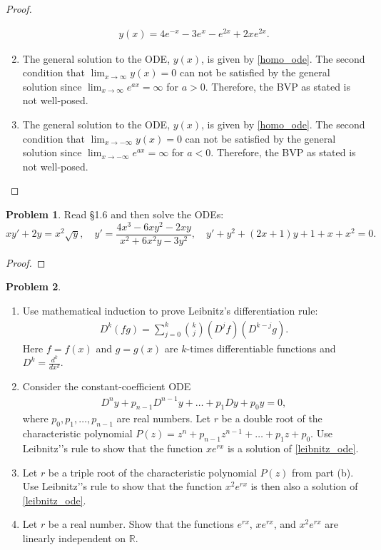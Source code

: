 \documentclass[12pt]{article}
\theoremstyle{definition}
\newtheorem{problem}{Problem}
\begin{document}
\begin{proof}
\begin{enumerate}
\begin{align*}
        y(x) = 4 e^{-x} -3e^{x} -e^{2x} +2xe^{2x}.
      \end{align*}
    \item The general solution to the ODE, $y(x)$, is given by \eqref{homo_ode}.
      The second condition that $\lim_{x\to\infty} y(x) = 0$ can not be satisfied
      by the general solution since $\lim_{x\to\infty} e^{ax} = \infty$ for $a>0$. Therefore,
      the BVP as stated is not well-posed.
    \item The general solution to the ODE, $y(x)$, is given by \eqref{homo_ode}.
      The second condition that $\lim_{x\to-\infty} y(x) = 0$ can not be satisfied
      by the general solution since $\lim_{x\to-\infty} e^{ax} = \infty$ for $a<0$. Therefore,
      the BVP as stated is not well-posed.
  \end{enumerate}
\end{proof}
\newpage


\begin{problem}
  Read \S1.6 and then solve the ODEs:
  $$xy' + 2y = x^2\sqrt{y}, \quad y' = \frac{4x^3-6xy^2-2xy}{x^2+6x^2y-3y^2}, \quad y' + y^2 +(2x+1)y + 1 + x + x^2 = 0.$$
\end{problem}

\begin{proof}
\end{proof}
\newpage


\begin{problem}
  \begin{enumerate}
    \item Use mathematical induction to prove Leibnitz's differentiation rule:
      \begin{align*}
        D^{k}(fg) = \sum_{j=0}^k \binom{k}{j}(D^j f) (D^{k-j}g).
      \end{align*}
      Here $f = f(x)$ and $g=g(x)$ are $k$-times differentiable functions and $D^k = \frac{d^k}{dx^k}$.
    \item Consider the constant-coefficient ODE
      \begin{align}\label{leibnitz_ode}
        D^n y + p_{n-1}D^{n-1}y + \dots + p_1 Dy + p_0 y = 0,
      \end{align}
      where $p_0, p_1, \dots, p_{n-1}$ are real numbers. Let $r$ be a double root of the characteristic polynomial
      $P(z) = z^n + p_{n-1} z^{n-1} + \dots + p_1 z + p_0.$ Use Leibnitz’'s rule to
      show that the function $xe^{rx}$ is a solution of \eqref{leibnitz_ode}.
    \item Let $r$ be a triple root of the characteristic polynomial $P(z)$ from part (b).
      Use Leibnitz'’s rule to show that the function $x^2 e^{rx}$
      is then also a solution of \eqref{leibnitz_ode}.
    \item Let $r$ be a real number. Show that the functions $e^{rx}$, $xe^{rx}$, and $x^2 e^{rx}$
      are linearly independent on $\mathbb{R}$.
  \end{enumerate}
\end{problem}
\end{document}
